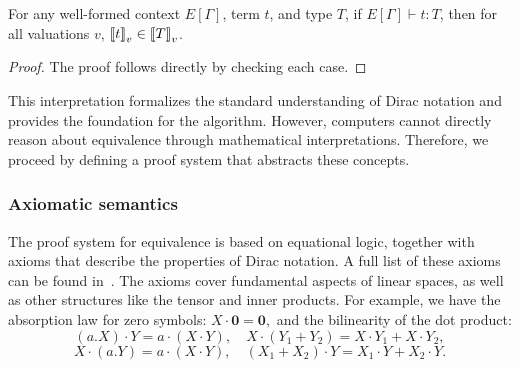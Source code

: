 \begin{lemma}
    For any well-formed context \( E[\Gamma] \), term \( t \), and type \( T \), if \( E[\Gamma] \vdash t : T \), then for all valuations \( v \), \( {\llbracket t \rrbracket}_v \in {\llbracket T \rrbracket}_v \).
\end{lemma}

\begin{proof}
    The proof follows directly by checking each case.
\end{proof}

This interpretation formalizes the standard understanding of Dirac notation and provides the foundation for the algorithm. However, computers cannot directly reason about equivalence through mathematical interpretations. Therefore, we proceed by defining a proof system that abstracts these concepts.



\subsubsection{Axiomatic semantics} 

The proof system for equivalence is based on equational logic, together with axioms that describe the properties of Dirac notation. A full list of these axioms can be found in~. The axioms cover fundamental aspects of linear spaces, as well as other structures like the tensor and inner products. For example, we have the absorption law for zero symbols:
\(X \cdot \mathbf{0} = \mathbf{0},\)
and the bilinearity of the dot product:
\[
(a.X) \cdot Y = a \cdot (X \cdot Y), \quad X \cdot (Y_1 + Y_2) = X \cdot Y_1 + X \cdot Y_2, 
\]
\[
X \cdot (a.Y) = a \cdot (X \cdot Y), \quad (X_1 + X_2) \cdot Y = X_1 \cdot Y + X_2 \cdot Y.
\]

